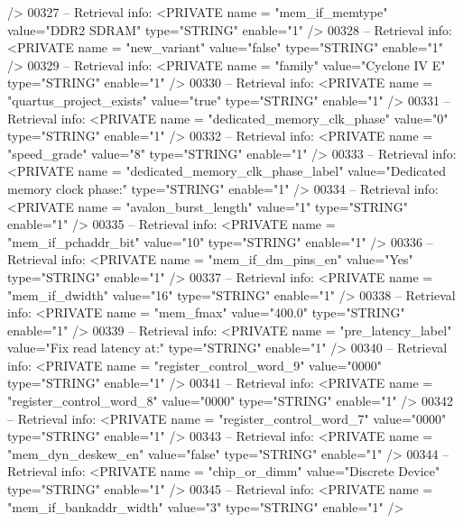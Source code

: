 \begin{DoxyCode}
{{       />}
00327 \textcolor{keyword}{-- Retrieval info:      <PRIVATE name = "mem\_if\_memtype" value="DDR2 SDRAM"  type="STRING"  enable="1" />}
00328 \textcolor{keyword}{-- Retrieval info:      <PRIVATE name = "new\_variant" value="false"  type="STRING"  enable="1" />}
00329 \textcolor{keyword}{-- Retrieval info:      <PRIVATE name = "family" value="Cyclone IV E"  type="STRING"  enable="1" />}
00330 \textcolor{keyword}{-- Retrieval info:      <PRIVATE name = "quartus\_project\_exists" value="true"  type="STRING"  enable="1" />}
00331 \textcolor{keyword}{-- Retrieval info:      <PRIVATE name = "dedicated\_memory\_clk\_phase" value="0"  type="STRING"  enable="1"
       />}
00332 \textcolor{keyword}{-- Retrieval info:      <PRIVATE name = "speed\_grade" value="8"  type="STRING"  enable="1" />}
00333 \textcolor{keyword}{-- Retrieval info:      <PRIVATE name = "dedicated\_memory\_clk\_phase\_label" value="Dedicated memory clock
       phase:"  type="STRING"  enable="1" />}
00334 \textcolor{keyword}{-- Retrieval info:      <PRIVATE name = "avalon\_burst\_length" value="1"  type="STRING"  enable="1" />}
00335 \textcolor{keyword}{-- Retrieval info:      <PRIVATE name = "mem\_if\_pchaddr\_bit" value="10"  type="STRING"  enable="1" />}
00336 \textcolor{keyword}{-- Retrieval info:      <PRIVATE name = "mem\_if\_dm\_pins\_en" value="Yes"  type="STRING"  enable="1" />}
00337 \textcolor{keyword}{-- Retrieval info:      <PRIVATE name = "mem\_if\_dwidth" value="16"  type="STRING"  enable="1" />}
00338 \textcolor{keyword}{-- Retrieval info:      <PRIVATE name = "mem\_fmax" value="400.0"  type="STRING"  enable="1" />}
00339 \textcolor{keyword}{-- Retrieval info:      <PRIVATE name = "pre\_latency\_label" value="Fix read latency at:"  type="STRING" 
       enable="1" />}
00340 \textcolor{keyword}{-- Retrieval info:      <PRIVATE name = "register\_control\_word\_9" value="0000"  type="STRING"  enable="1"
       />}
00341 \textcolor{keyword}{-- Retrieval info:      <PRIVATE name = "register\_control\_word\_8" value="0000"  type="STRING"  enable="1"
       />}
00342 \textcolor{keyword}{-- Retrieval info:      <PRIVATE name = "register\_control\_word\_7" value="0000"  type="STRING"  enable="1"
       />}
00343 \textcolor{keyword}{-- Retrieval info:      <PRIVATE name = "mem\_dyn\_deskew\_en" value="false"  type="STRING"  enable="1" />}
00344 \textcolor{keyword}{-- Retrieval info:      <PRIVATE name = "chip\_or\_dimm" value="Discrete Device"  type="STRING"  enable="1"
       />}
00345 \textcolor{keyword}{-- Retrieval info:      <PRIVATE name = "mem\_if\_bankaddr\_width" value="3"  type="STRING"  enable="1" />}
}
\end{DoxyCode}
